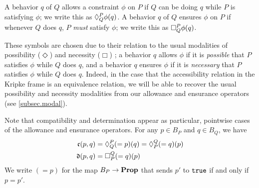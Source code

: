     A behavior $q$ of $Q$ allows a constraint $\phi$ on $P$ if $Q$ can be doing $q$ while $P$ is satisfying $\phi$; we write this as $\allows{P}{Q}\phi(q)$. A behavior $q$ of $Q$ ensures $\phi$ on $P$ if whenever $Q$ does $q$, $P$ \emph{must} satisfy $\phi$; we write this as $\ensure{P}{Q}\phi(q)$.
    
    These symbols are chosen due to their relation to the usual modalities of possibility ($\Diamond$) and necessity ($\Box$) \cite{kripke1963semantical}; a behavior $q$ allows $\phi$ if it is \emph{possible} that $P$ satisfies $\phi$ while $Q$ does $q$, and a behavior $q$ ensures $\phi$ if it is \emph{necessary} that $P$ satisfies $\phi$ while $Q$ does $q$. Indeed, in the case that the accessibility relation in the Kripke frame is an equivalence relation, we will be able to recover the usual possibility and necessity modalities from our allowance and ensurance operators (see \cref{subsec.modal}).
    
    Note that compatibility and determination appear as particular, pointwise
    cases of the allowance and ensurance operators. For any $p\in B_P$ and $q\in
    B_Q$, we have
    \begin{align*}
        \mathfrak{c}(p, q) &= \allows{P}{Q}(=p)(q) = \allows{Q}{P}(=q)(p) \\
        \mathfrak{d}(p, q) &= \ensure{Q}{P}(=q)(p)
    \end{align*}
    We write $(=p)$ for the map $B_P\to\Prop$ that sends $p'$ to $\true$ if and only if $p=p'$.
    
